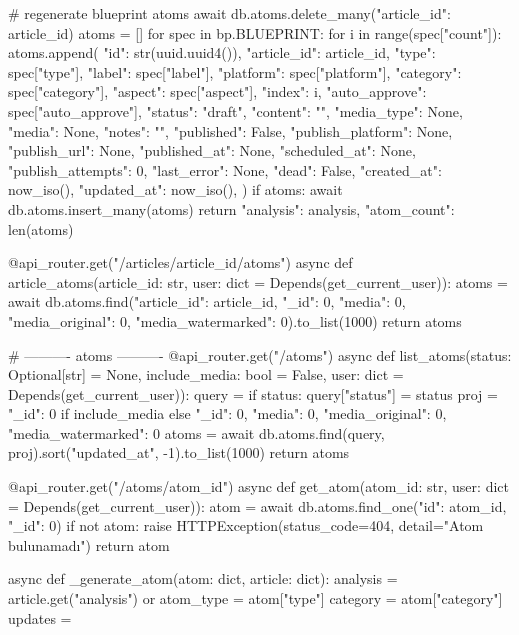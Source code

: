     # regenerate blueprint atoms
    await db.atoms.delete_many({"article_id": article_id})
    atoms = []
    for spec in bp.BLUEPRINT:
        for i in range(spec["count"]):
            atoms.append({
                "id": str(uuid.uuid4()),
                "article_id": article_id,
                "type": spec["type"],
                "label": spec["label"],
                "platform": spec["platform"],
                "category": spec["category"],
                "aspect": spec["aspect"],
                "index": i,
                "auto_approve": spec["auto_approve"],
                "status": "draft",
                "content": "",
                "media_type": None,
                "media": None,
                "notes": "",
                "published": False,
                "publish_platform": None,
                "publish_url": None,
                "published_at": None,
                "scheduled_at": None,
                "publish_attempts": 0,
                "last_error": None,
                "dead": False,
                "created_at": now_iso(),
                "updated_at": now_iso(),
            })
    if atoms:
        await db.atoms.insert_many(atoms)
    return {"analysis": analysis, "atom_count": len(atoms)}


@api_router.get("/articles/{article_id}/atoms")
async def article_atoms(article_id: str, user: dict = Depends(get_current_user)):
    atoms = await db.atoms.find({"article_id": article_id}, {"_id": 0, "media": 0, "media_original": 0, "media_watermarked": 0}).to_list(1000)
    return atoms


# ---------- atoms ----------
@api_router.get("/atoms")
async def list_atoms(status: Optional[str] = None, include_media: bool = False, user: dict = Depends(get_current_user)):
    query = {}
    if status:
        query["status"] = status
    proj = {"_id": 0} if include_media else {"_id": 0, "media": 0, "media_original": 0, "media_watermarked": 0}
    atoms = await db.atoms.find(query, proj).sort("updated_at", -1).to_list(1000)
    return atoms


@api_router.get("/atoms/{atom_id}")
async def get_atom(atom_id: str, user: dict = Depends(get_current_user)):
    atom = await db.atoms.find_one({"id": atom_id}, {"_id": 0})
    if not atom:
        raise HTTPException(status_code=404, detail="Atom bulunamadı")
    return atom


async def _generate_atom(atom: dict, article: dict):
    analysis = article.get("analysis") or {}
    atom_type = atom["type"]
    category = atom["category"]
    updates = {}

